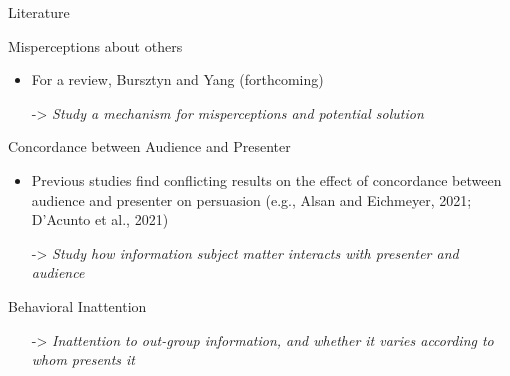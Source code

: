 \documentclass[10pt]{beamer}
\begin{document}



\begin{frame}{Literature}
\label{Lit}
\begin{block}{Misperceptions about others}
\begin{itemize}
    \item For a review, Bursztyn and Yang (forthcoming)
  \item[->] \textit{Study a mechanism for misperceptions and potential solution} 
\end{itemize}
\end{block}
\begin{block}{Concordance between Audience and Presenter}
    \begin{itemize}
    \item Previous studies find conflicting results on the effect of concordance between audience and presenter on persuasion  (e.g., Alsan and Eichmeyer, 2021; D’Acunto
et al., 2021)
    \item[->] \textit{Study how information subject matter interacts with presenter and audience}
    \end{itemize}
\end{block}
\begin{block}{Behavioral Inattention}
\begin{itemize}
    \item[->] \textit{Inattention to out-group information, and whether it varies according to whom presents it}
\end{itemize}
\end{block}
\end{frame}
\end{document}

